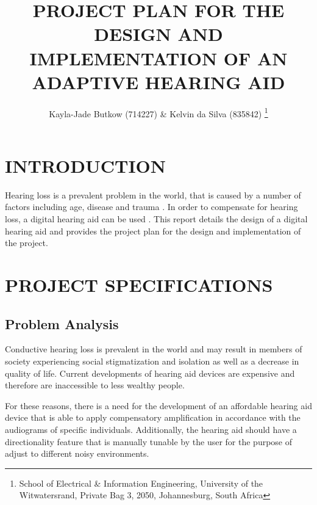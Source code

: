 \documentclass[10pt,twocolumn]{witseiepaper}
\begin{document}
\title{PROJECT PLAN FOR THE DESIGN AND IMPLEMENTATION OF AN ADAPTIVE HEARING AID}

\author{Kayla-Jade Butkow (714227) \& Kelvin da Silva (835842) 
\thanks{School of Electrical \& Information Engineering, University of the
Witwatersrand, Private Bag 3, 2050, Johannesburg, South Africa}
}


%
\abstract{ }

\keywords{}

\maketitle
\thispagestyle{empty}
\pagestyle{plain}
\setcounter{page}{1}

%
\section{INTRODUCTION}
Hearing loss is a prevalent problem in the world, that is caused by a number of factors including age, disease and trauma \cite{Evaluation_of_a_hearing_compensation_algorithm}. In order to compensate for hearing loss, a digital hearing aid can be used \cite{Evaluation_of_a_hearing_compensation_algorithm}. This report details the design of a digital hearing aid and provides the project plan for the design and implementation of the project. 

\section{PROJECT SPECIFICATIONS}
\subsection{Problem Analysis}
Conductive hearing loss is prevalent in the world and may result in members of society experiencing social stigmatization and isolation as well as a decrease in quality of life. Current developments of hearing aid devices are expensive and therefore are inaccessible to less wealthy people.

For these reasons, there is a need for the development of an affordable hearing aid device that is able to apply compensatory amplification in accordance with the audiograms of specific individuals. Additionally, the hearing aid should have a directionality feature that is manually tunable by the user for the purpose of adjust to different noisy environments. 
\end{document}
